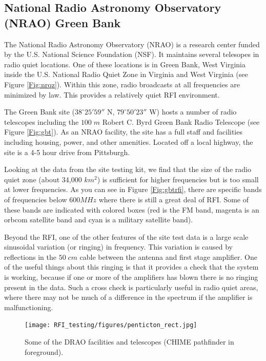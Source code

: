 \subsection{National Radio Astronomy Observatory (NRAO) Green Bank}

The National Radio Astronomy Observatory (NRAO) is a research center funded by the U.S. National Science Foundation (NSF). It maintains several telesopes in radio quiet locations. One of these locations is in Green Bank, West Virginia inside the U.S. National Radio Quiet Zone in Virginia and West Virginia (see Figure \ref{Fig:nrqz}). Within this zone, radio broadcasts at all frequencies are minimized by law. This provides a relatively quiet RFI environment. 

The Green Bank site ($38^\circ 25' 59''$ N, $79^\circ 50' 23''$ W) hosts a number of radio telescopes including the $100 \; m$ Robert C. Byrd Green Bank Radio Telescope (see Figure \ref{Fig:gbt}). As an NRAO facility, the site has a full staff and facilities including housing, power, and other amenities. Located off a local highway, the site is a 4-5 hour drive from Pittsburgh. 

Looking at the data from the site testing kit, we find that the size of the radio quiet zone (about 34,000 $km^2$) is sufficient for higher frequencies but is too small at lower frequencies. As you can see in Figure \ref{Fig:gbtrfi}, there are specific bands of frequencies below $600 MHz$ where there is still a great deal of RFI. Some of these bands are indicated with colored boxes (red is the FM band, magenta is an orbcom satellite band and cyan is a military satellite band). 

Beyond the RFI, one of the other features of the site test data is a large scale sinusoidal variation (or ringing) in frequency. This variation is caused by reflections in the $50 \; cm$ cable between the antenna and first stage amplifier. One of the useful things about this ringing is that it provides a check that the system is working, because if one or more of the amplifiers has blown there is no ringing present in the data. Such a cross check is particularly useful in radio quiet areas, where there may not be much of a difference in the spectrum if the amplifier is malfunctioning. 

\begin{figure}[htb]
\begin{center}
\texttt{[image: RFI\_testing/figures/penticton\_rect.jpg]}
\caption{Some of the DRAO facilities and telescopes (CHIME pathfinder in foreground). }
\label{Fig:penticton}
\end{center}
\end{figure}

